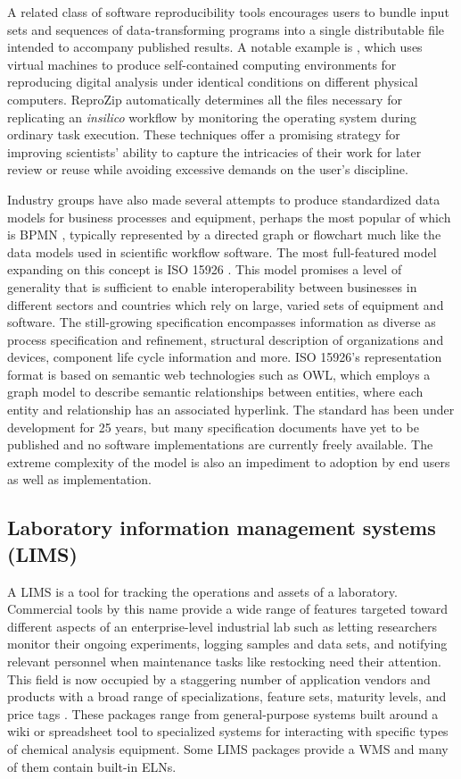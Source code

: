 \documentclass[../thesis]{subfiles}
\begin{document}
A related class of software reproducibility tools encourages users to
bundle input sets and sequences of data-transforming programs into a
single distributable file intended to accompany published results.
A notable example is \cite{ReproZip}, which uses virtual machines to
produce self-contained computing environments for reproducing digital
analysis under identical conditions on different physical
computers. ReproZip automatically determines all the files necessary
for replicating an \textit{\gls{insilico}} workflow by monitoring the operating
system during ordinary task execution. These techniques offer a
promising strategy for improving scientists' ability to capture the
intricacies of their work for later review or reuse while avoiding
excessive demands on the user's discipline.

Industry groups have also made several attempts to produce
standardized data models for business processes and equipment, perhaps
the most popular of which is \gls{BPMN}
\cite{Allweyer:2010:BPM:1841147}, typically represented by a directed
graph or flowchart much like the data models used in scientific
workflow software. The
most full-featured model expanding on this concept is ISO 15926
\cite{West2009}. This model promises
a level of generality that is sufficient to enable interoperability
between businesses in different sectors and countries which rely on
large, varied sets of equipment and software. The still-growing
specification encompasses information as diverse as process
specification and refinement, structural description of organizations
and devices, component life cycle information and more. ISO 15926's
representation format is based on semantic web technologies such as OWL, which
employs a graph model to describe semantic relationships between
entities, where each entity and relationship has an associated
hyperlink. The standard has been under development for 25 years, but
many specification documents have yet to be published and no software
implementations are currently freely available. The extreme complexity
of the model is also an impediment to adoption by end users as well as
implementation.

\subsection{Laboratory information management systems (LIMS)}
A \gls{LIMS} is a tool for tracking the operations and assets of a
laboratory. Commercial tools by this name provide a wide range of
features targeted toward different aspects of an enterprise-level
industrial lab such as letting researchers monitor their ongoing
experiments, logging samples and data sets, and notifying relevant
personnel when maintenance tasks like restocking need their
attention. This field is now occupied by a staggering number of
application vendors and products with a broad range of
specializations, feature sets, maturity levels, and price tags
\cite{LIMSWikiList}. These packages range from general-purpose systems
built around a wiki or spreadsheet tool to specialized systems for
interacting with specific types of chemical analysis equipment.  Some
\gls{LIMS} packages provide a \gls{WMS} and many of them contain
built-in \gls{ELN}s.
\end{document}
